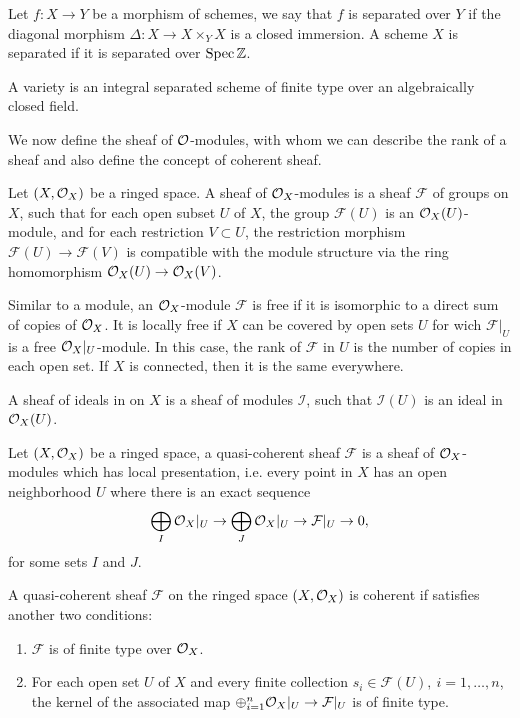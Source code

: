 \documentclass[
	oldfontcommands,
	sumario=abnt-6027-2012,
	12pt,			%
	openright,		%
	oneside,		%
	a4paper,		%
	english,		%
	brazil			%
	]{imecc-unicamp}
\begin{document}
Let $f:X\rightarrow Y$ be a morphism of schemes, we say that $f$ is separated over $Y$ if the diagonal morphism $\Delta:X\rightarrow X\times_Y X$ is a closed immersion. A scheme $X$ is separated if it is separated over $\operatorname{Spec} {\mathbb Z}$.

\begin{definition}
	A variety is an integral separated scheme of finite type over an algebraically closed field.
\end{definition}

We now define the sheaf of ${\mathcal O}$-modules, with whom we can describe the rank of a sheaf and also define the concept of coherent sheaf.

\begin{definition}
	Let $(X,{\mathcal O}_X)$ be a ringed space. A sheaf of ${\mathcal O}_X$-modules is a sheaf $\mathcal F$ of groups on $X$, such that for each open subset $U$ of $X$, the group $\mathcal F(U)$ is an ${\mathcal O}_X(U)$-module, and for each restriction $V\subset U$, the restriction morphism $\mathcal F(U)\rightarrow \mathcal F(V)$ is compatible with the module structure via the ring homomorphism ${\mathcal O}_X(U)\rightarrow {\mathcal O}_X(V)$.
	
	Similar to a module, an ${\mathcal O}_X$-module $\mathcal F$ is free if it is isomorphic to a direct sum of copies of ${\mathcal O}_X$. It is locally free if $X$ can be covered by open sets $U$ for wich $\mathcal F|_U$ is a free ${\mathcal O}_X|_U$-module. In this case, the rank of $\mathcal F$ in $U$ is the number of copies in each open set. If $X$ is connected, then it is the same everywhere.
	
	A sheaf of ideals in on $X$ is a sheaf of modules $\mathcal I$, such that $\mathcal I(U)$ is an ideal in ${\mathcal O}_X(U)$.
\end{definition}

\begin{definition}
	Let $(X,{\mathcal O}_X)$ be a ringed space, a quasi-coherent sheaf $\mathcal F$ is a sheaf of ${\mathcal O}_X$-modules which has local presentation, i.e. every point in $X$ has an open neighborhood $U$ where there is an exact sequence 
	$$
	\bigoplus_I{\mathcal O}_X|_U\rightarrow \bigoplus_J {\mathcal O}_X|_U\rightarrow \mathcal F|_U\rightarrow 0,
	$$
	for some sets $I$ and $J$.
	
	A quasi-coherent sheaf $\mathcal F$ on the ringed space $(X,{\mathcal O}_X) $ is coherent if satisfies another two conditions: \begin{enumerate}
		\item $\mathcal F$ is of finite type over ${\mathcal O}_X$.
		\item For each open set $U$ of $X$ and every finite collection $s_i\in \mathcal F(U),~i=1,\dots,n$, the kernel of the associated map $ \oplus_{i=1}^n{\mathcal O}_X|_U\rightarrow \mathcal F|_U$ is of finite type.
	\end{enumerate} 
	
\end{definition}
\end{document}
